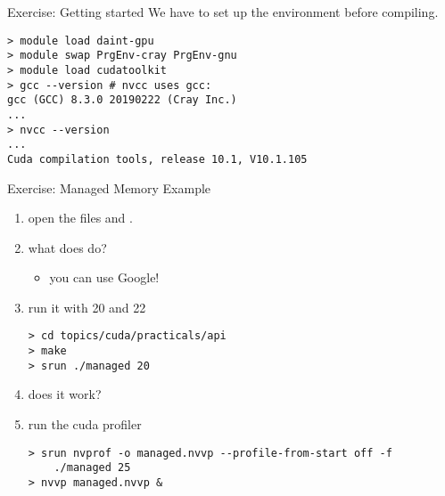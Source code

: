 \documentclass[aspectratio=43]{beamer}
\begin{document}
\begin{frame}[fragile]{Exercise: Getting started}
    We have to set up the environment before compiling.
    \begin{lstlisting}[style=terminal]
> module load daint-gpu
> module swap PrgEnv-cray PrgEnv-gnu
> module load cudatoolkit
> gcc --version # nvcc uses gcc:
gcc (GCC) 8.3.0 20190222 (Cray Inc.)
...
> nvcc --version
...
Cuda compilation tools, release 10.1, V10.1.105
    \end{lstlisting}
\end{frame}

\begin{frame}[fragile]{Exercise: Managed Memory Example}
    \begin{enumerate}
        \item open the files  and .
        \item what does  do?
        \begin{itemize}
            \item you can use Google!
        \end{itemize}
        \item run it with 20 and 22
    \begin{terminal}{}
    \begin{lstlisting}[style=terminal]
> cd topics/cuda/practicals/api
> make
> srun ./managed 20
    \end{lstlisting}
    \end{terminal}
        \item does it work?
        \item run the cuda profiler
        \begin{terminal}{}
            \begin{lstlisting}[style=terminal]
> srun nvprof -o managed.nvvp --profile-from-start off -f
    ./managed 25
> nvvp managed.nvvp &
            \end{lstlisting}
        \end{terminal}
    \end{enumerate}
\end{frame}
\end{document}
